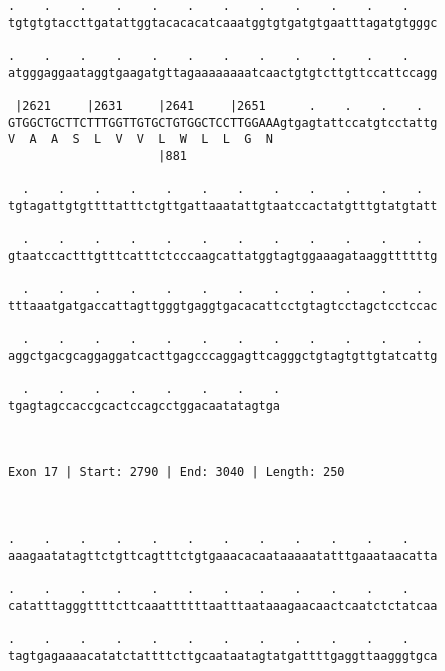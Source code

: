 \documentclass{article}
\begin{document}
\begin{Verbatim}
.    .    .    .    .    .    .    .    .    .    .    .    
tgtgtgtaccttgatattggtacacacatcaaatggtgtgatgtgaatttagatgtgggc
                                                            
.    .    .    .    .    .    .    .    .    .    .    .    
atgggaggaataggtgaagatgttagaaaaaaaatcaactgtgtcttgttccattccagg
                                                            
 |2621     |2631     |2641     |2651      .    .    .    .  
GTGGCTGCTTCTTTGGTTGTGCTGTGGCTCCTTGGAAAgtgagtattccatgtcctattg
V  A  A  S  L  V  V  L  W  L  L  G  N                       
                     |881                                   
  
  .    .    .    .    .    .    .    .    .    .    .    .  
tgtagattgtgttttatttctgttgattaaatattgtaatccactatgtttgtatgtatt
                                                            
  .    .    .    .    .    .    .    .    .    .    .    .  
gtaatccactttgtttcatttctcccaagcattatggtagtggaaagataaggttttttg
                                                            
  .    .    .    .    .    .    .    .    .    .    .    .  
tttaaatgatgaccattagttgggtgaggtgacacattcctgtagtcctagctcctccac
                                                            
  .    .    .    .    .    .    .    .    .    .    .    .  
aggctgacgcaggaggatcacttgagcccaggagttcagggctgtagtgttgtatcattg
                                                            
  .    .    .    .    .    .    .    .
tgagtagccaccgcactccagcctggacaatatagtga
                                      
                                      
 
Exon 17 | Start: 2790 | End: 3040 | Length: 250



.    .    .    .    .    .    .    .    .    .    .    .    
aaagaatatagttctgttcagtttctgtgaaacacaataaaaatatttgaaataacatta
                                                            
.    .    .    .    .    .    .    .    .    .    .    .    
catatttagggttttcttcaaattttttaatttaataaagaacaactcaatctctatcaa
                                                            
.    .    .    .    .    .    .    .    .    .    .    .    
tagtgagaaaacatatctattttcttgcaataatagtatgattttgaggttaagggtgca
                                                            

\end{Verbatim}
\end{document}
